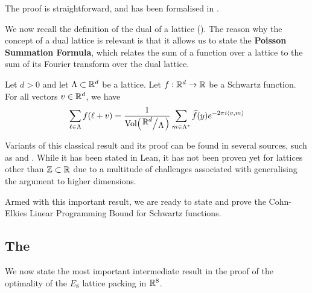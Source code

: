 The proof is straightforward, and has been formalised in \mathlib.

We now recall the definition of the dual of a lattice (). The reason why the concept of a dual lattice is relevant is that it allows us to state the \textbf{Poisson Summation Formula}, which relates the sum of a function over a lattice to the sum of its Fourier transform over the dual lattice.

\begin{boxtheorem}\label{Ch2:Thm:Poisson_Summation}
    Let $d > 0$ and let $\Lambda \subset \mathbb{R}^d$ be a lattice. Let $f : \mathbb{R}^d \to \mathbb{R}$ be a Schwartz function. For all vectors $v \in \mathbb{R}^d$, we have
    \begin{align*}
        \sum_{\ell \in \Lambda} \fof{\ell + v} = \frac{1}{\Volof{\quotient{\R^d}{\Lambda}}} \sum_{m \in \Lambda^*} \hat{f}(y) e^{-2\pi i \cycl{v, m}}
    \end{align*}
\end{boxtheorem}

Variants of this classical result and its proof can be found in several sources, such as \cite[Chapter VII, \S6, Proposition 15]{SerreArith} and \cite[Chapter VII, \S7, Equation (VII, 7:5)]{SchwartzDistrib}. While it has been stated in Lean, it has not been proven yet for lattices other than $\mathbb{Z} \subset \mathbb{R}$ due to a multitude of challenges associated with generalising the argument to higher dimensions.

Armed with this important result, we are ready to state and prove the Cohn-Elkies Linear Programming Bound for Schwartz functions.

\subsection{The \CELP}

We now state the most important intermediate result in the proof of the optimality of the $E_8$ lattice packing in $\mathbb{R}^8$.

